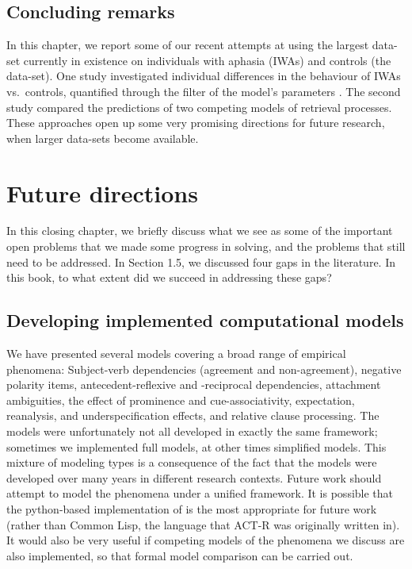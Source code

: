 \documentclass{cambridge7A}\usepackage[]{graphicx}\usepackage[]{color}
\begin{document}
\section{Concluding remarks}

In this chapter, we report some of our recent attempts at using the largest data-set currently in existence on individuals with aphasia (IWAs) and controls (the \cite{CaplanEtAl2015} data-set). One study investigated individual differences in the behaviour of IWAs vs.\ controls, quantified through the filter of the model's parameters \citep{MaetzigEtAltopics2018}. The second study \citep{LissonEtAl2020} compared the predictions of two competing models of retrieval processes. These approaches open up some very promising directions for future research, when larger data-sets become available.


\chapter{Future directions} \label{c09}

In this closing chapter, we briefly discuss what we see as some of the important open problems that we made some progress in solving, and the problems that still need to be addressed. In Section 1.5, we discussed four gaps in the literature. In this book, to what extent did we succeed in addressing these gaps?

\section{Developing implemented computational models}

We have presented several models covering a broad range of empirical phenomena: Subject-verb dependencies (agreement and non-agreement), negative polarity items,  antecedent-reflexive and -reciprocal dependencies, attachment ambiguities, the effect of prominence and cue-associativity,  expectation, reanalysis, and underspecification effects, and relative clause processing. The models were unfortunately not all developed in exactly the same framework; sometimes we implemented full models, at other times simplified models. This mixture of modeling types is a consequence of the fact that the models were developed over many years in different research contexts. Future work should attempt to model the phenomena under a unified framework. It is possible that the python-based implementation of \cite{bdactrbook} is the most appropriate for future work (rather than Common Lisp, the language that ACT-R was originally written in). It would also be very useful if competing models of the phenomena we discuss are also implemented, so that formal model comparison can be carried out. 
\end{document}
